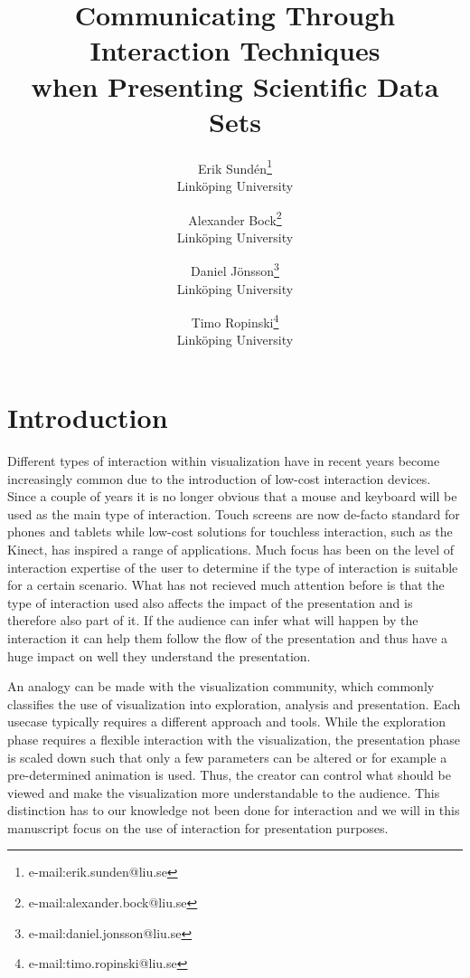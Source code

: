 \documentclass[review,journal]{vgtc}         %
\title{Communicating Through Interaction Techniques\\when Presenting Scientific Data Sets} %
\author{Erik Sund\'en\thanks{e-mail:erik.sunden@liu.se}\\ %
        \scriptsize Link{\"o}ping University %
\and Alexander Bock\thanks{e-mail:alexander.bock@liu.se}\\ %
			   \scriptsize Link{\"o}ping University %
\and Daniel J\"onsson\thanks{e-mail:daniel.jonsson@liu.se}\\ %
          \scriptsize Link{\"o}ping University %
\and Timo Ropinski\thanks{e-mail:timo.ropinski@liu.se}\\ %
           \scriptsize Link{\"o}ping University }
\begin{document}

\maketitle

\section{Introduction}\label{sec:introduction}
Different types of interaction within visualization have in recent years become increasingly common due to the introduction of low-cost interaction devices.
Since a couple of years it is no longer obvious that a mouse and keyboard will be used as the main type of interaction. 
Touch screens are now de-facto standard for phones and tablets while low-cost solutions for touchless interaction, such as the Kinect, has inspired a range of applications. 
Much focus has been on the level of interaction expertise of the user to determine if the type of interaction is suitable for a certain scenario. What has not recieved much attention before is that the type of interaction used also affects the impact of the presentation and is therefore also part of it. If the audience can infer what will happen by the interaction it can help them follow the flow of the presentation and thus have a huge impact on well they understand the presentation.

An analogy can be made with the visualization community, which commonly classifies the use of visualization into exploration, analysis and presentation. Each usecase typically requires a different approach and tools. 
While the exploration phase requires a flexible interaction with the visualization, the presentation phase is scaled down such that only a few parameters can be altered or for example a pre-determined animation is used. Thus, the creator can control what should be viewed and make the visualization more understandable to the audience.
This distinction has to our knowledge not been done for interaction and we will in this manuscript focus on the use of interaction for presentation purposes.
\end{document}
